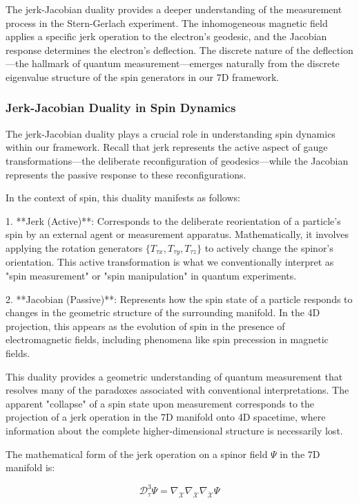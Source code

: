 \documentclass{article}
\begin{document}
The jerk-Jacobian duality provides a deeper understanding of the measurement process in the Stern-Gerlach experiment. The inhomogeneous magnetic field applies a specific jerk operation to the electron's geodesic, and the Jacobian response determines the electron's deflection. The discrete nature of the deflection—the hallmark of quantum measurement—emerges naturally from the discrete eigenvalue structure of the spin generators in our 7D framework.

\subsubsection{Jerk-Jacobian Duality in Spin Dynamics}

The jerk-Jacobian duality plays a crucial role in understanding spin dynamics within our framework. Recall that jerk represents the active aspect of gauge transformations—the deliberate reconfiguration of geodesics—while the Jacobian represents the passive response to these reconfigurations.

In the context of spin, this duality manifests as follows:

1. **Jerk (Active)**: Corresponds to the deliberate reorientation of a particle's spin by an external agent or measurement apparatus. Mathematically, it involves applying the rotation generators $\{T_{\tau x}, T_{\tau y}, T_{\tau z}\}$ to actively change the spinor's orientation. This active transformation is what we conventionally interpret as "spin measurement" or "spin manipulation" in quantum experiments.

2. **Jacobian (Passive)**: Represents how the spin state of a particle responds to changes in the geometric structure of the surrounding manifold. In the 4D projection, this appears as the evolution of spin in the presence of electromagnetic fields, including phenomena like spin precession in magnetic fields.

This duality provides a geometric understanding of quantum measurement that resolves many of the paradoxes associated with conventional interpretations. The apparent "collapse" of a spin state upon measurement corresponds to the projection of a jerk operation in the 7D manifold onto 4D spacetime, where information about the complete higher-dimensional structure is necessarily lost.

The mathematical form of the jerk operation on a spinor field $\Psi$ in the 7D manifold is:

\begin{equation}
\mathcal{D}_\tau^3 \Psi = \nabla_{\dot{\mathcal{X}}} \nabla_{\dot{\mathcal{X}}} \nabla_{\dot{\mathcal{X}}} \Psi
\end{equation}
\end{document}

